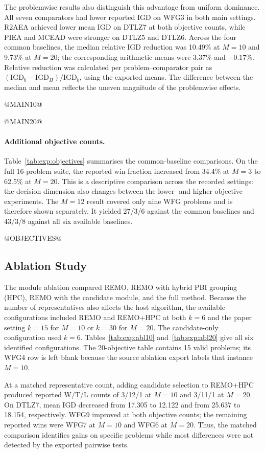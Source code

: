 The problemwise results also distinguish this advantage from uniform
dominance. All seven comparators had lower reported IGD on WFG3 in both
main settings. R2AEA achieved lower mean IGD on DTLZ7 at both objective
counts, while PIEA and MCEAD were stronger on DTLZ5 and DTLZ6. Across the
four common baselines, the median relative IGD reduction was 10.49\% at
$M=10$ and 9.73\% at $M=20$; the corresponding arithmetic means were
3.37\% and $-0.17\%$. Relative reduction was calculated per
problem--comparator pair as $(\mathrm{IGD}_{b}-\mathrm{IGD}_{H})/
\mathrm{IGD}_{b}$, using the exported means. The difference between the
median and mean reflects the uneven magnitude of the problemwise effects.

@MAIN10@

@MAIN20@

\paragraph{Additional objective counts.}
Table~\ref{tab:exp:objectives} summarises the common-baseline comparisons.
On the full 16-problem suite, the reported win fraction increased from
34.4\% at $M=3$ to 62.5\% at $M=20$. This is a descriptive comparison
across the recorded settings: the decision dimension also changes between
the lower- and higher-objective experiments. The $M=12$ result covered
only nine WFG problems and is therefore shown separately. It yielded
27/3/6 against the common baselines and 43/3/8 against all six available
baselines.

@OBJECTIVES@

\subsection{Ablation Study}
\label{sec:exp:ablation}

The module ablation compared REMO, REMO with hybrid PBI grouping (HPC),
REMO with the candidate module, and the full method. Because the number
of representatives also affects the host algorithm, the available
configurations included REMO and REMO+HPC at both $k=6$ and the paper
setting $k=15$ for $M=10$ or $k=30$ for $M=20$. The candidate-only
configuration used $k=6$. Tables~\ref{tab:exp:abl10}
and~\ref{tab:exp:abl20} give all six identified configurations. The
20-objective table contains 15 valid problems; its WFG4 row is left blank
because the source ablation export labels that instance $M=10$.

At a matched representative count, adding candidate selection to
REMO+HPC produced reported W/T/L counts of 3/12/1 at $M=10$ and 3/11/1
at $M=20$. On DTLZ7, mean IGD decreased from 17.305 to 12.122 and from
25.637 to 18.154, respectively. WFG9 improved at both objective counts;
the remaining reported wins were WFG7 at $M=10$ and WFG6 at $M=20$.
Thus, the matched comparison identifies gains on specific problems while
most differences were not detected by the exported pairwise tests.

